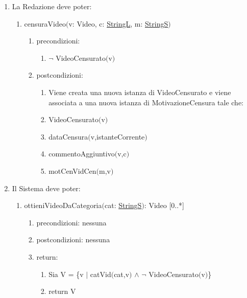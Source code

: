 \documentclass{article}
\begin{document}
\begin{enumerate}
\begin{enumerate}
    \end{enumerate}
    \newpage
    \item\label{sec:OperazioniRedazione} La Redazione deve poter:
    \begin{enumerate}
        \item censuraVideo$($v: Video, c: \hyperref[sec:TipoStringL]{StringL}, m: \hyperref[sec:TipoStringS]{StringS}$)$
        \begin{enumerate}
            \item precondizioni:
            \begin{enumerate}
                \item $\neg$ VideoCensurato$($v$)$
            \end{enumerate}
            \item postcondizioni:
            \begin{enumerate}
                \item Viene creata una nuova istanza di VideoCensurato e viene associata a una nuova istanza di MotivazioneCensura tale che:
                \item VideoCensurato$($v$)$
                \item dataCensura$($v,istanteCorrente$)$
                \item commentoAggiuntivo$($v,c$)$
                \item motCenVidCen$($m,v$)$
            \end{enumerate}
        \end{enumerate}
    \end{enumerate}
    \newpage
    \item\label{sec:OperazioniSistema} Il Sistema deve poter:
    \begin{enumerate}
        \item ottieniVideoDaCategoria$($cat: \hyperref[sec:TipoStringS]{StringS}$)$: Video [0..*]
        \begin{enumerate}
            \item precondizioni: nessuna
            \item postcondizioni: nessuna
            \item return:
            \begin{enumerate}
                \item Sia V = \{v $|$ catVid$($cat,v$)$ $\land$ $\neg$ VideoCensurato$($v$)$\}
                \item return V
            \end{enumerate}
        \end{enumerate}

\end{enumerate}
\end{enumerate}
\end{document}
